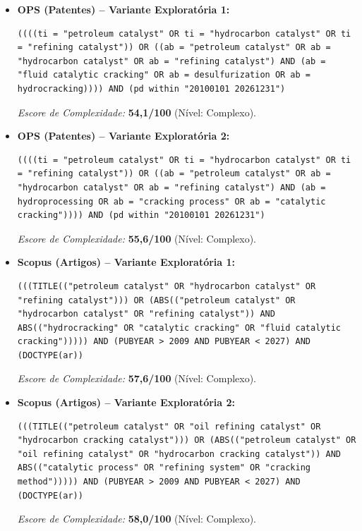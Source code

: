 \documentclass[12pt, a4paper]{article}
\begin{document}
  \begin{itemize}[leftmargin=*]
    \item \textbf{OPS (Patentes) -- Variante Exploratória 1:}
    \begin{lstlisting}[style=prompt]
((((ti = "petroleum catalyst" OR ti = "hydrocarbon catalyst" OR ti = "refining catalyst")) OR ((ab = "petroleum catalyst" OR ab = "hydrocarbon catalyst" OR ab = "refining catalyst") AND (ab = "fluid catalytic cracking" OR ab = desulfurization OR ab = hydrocracking)))) AND (pd within "20100101 20261231")
    \end{lstlisting}
    \textit{Escore de Complexidade:} \textbf{54,1/100} (Nível: Complexo).

    \item \textbf{OPS (Patentes) -- Variante Exploratória 2:}
    \begin{lstlisting}[style=prompt]
((((ti = "petroleum catalyst" OR ti = "hydrocarbon catalyst" OR ti = "refining catalyst")) OR ((ab = "petroleum catalyst" OR ab = "hydrocarbon catalyst" OR ab = "refining catalyst") AND (ab = hydroprocessing OR ab = "cracking process" OR ab = "catalytic cracking")))) AND (pd within "20100101 20261231")
    \end{lstlisting}
    \textit{Escore de Complexidade:} \textbf{55,6/100} (Nível: Complexo).

    \item \textbf{Scopus (Artigos) -- Variante Exploratória 1:}
    \begin{lstlisting}[style=prompt]
(((TITLE(("petroleum catalyst" OR "hydrocarbon catalyst" OR "refining catalyst"))) OR (ABS(("petroleum catalyst" OR "hydrocarbon catalyst" OR "refining catalyst")) AND ABS(("hydrocracking" OR "catalytic cracking" OR "fluid catalytic cracking"))))) AND (PUBYEAR > 2009 AND PUBYEAR < 2027) AND (DOCTYPE(ar))
    \end{lstlisting}
    \textit{Escore de Complexidade:} \textbf{57,6/100} (Nível: Complexo).

    \item \textbf{Scopus (Artigos) -- Variante Exploratória 2:}
    \begin{lstlisting}[style=prompt]
(((TITLE(("petroleum catalyst" OR "oil refining catalyst" OR "hydrocarbon cracking catalyst"))) OR (ABS(("petroleum catalyst" OR "oil refining catalyst" OR "hydrocarbon cracking catalyst")) AND ABS(("catalytic process" OR "refining system" OR "cracking method"))))) AND (PUBYEAR > 2009 AND PUBYEAR < 2027) AND (DOCTYPE(ar))
    \end{lstlisting}
    \textit{Escore de Complexidade:} \textbf{58,0/100} (Nível: Complexo).
  \end{itemize}
\end{document}
